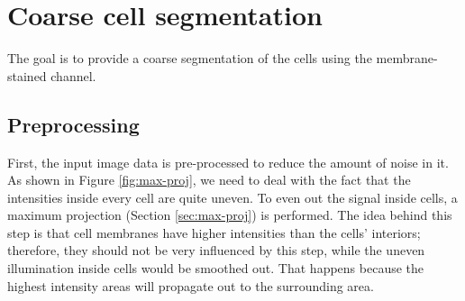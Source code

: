 \documentclass[
  digital,     %
  oneside,     %
  nosansbold,  %
  nocolorbold, %
  lof,         %
  lot,         %
]{fithesis4}
\begin{document}
\section{Coarse cell segmentation}
The goal is to provide a coarse segmentation of the cells using the
membrane-stained channel.

\subsection{Preprocessing}
First, the input image data is pre-processed to reduce the amount of noise in it.
As shown in Figure \ref{fig:max-proj}, we need to deal with the
fact that the intensities inside every cell are quite uneven. To even out the
signal inside cells, a maximum projection (Section \ref{sec:max-proj}) is
performed. The idea behind this step is that cell membranes have higher intensities than
the cells' interiors; therefore, they should not be very influenced by this step,
while the uneven illumination inside cells would be smoothed out. That happens
because the highest intensity areas will propagate out to the surrounding area.
\end{document}
